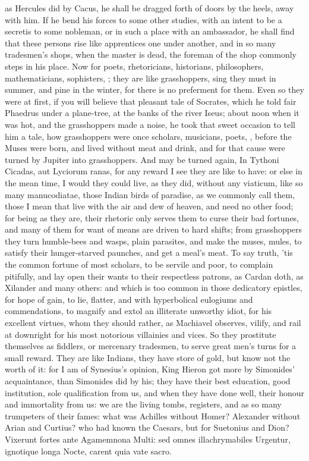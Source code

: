 {{as Hercules did by Cacus, he shall be dragged forth of doors by the
heels, away with him. If he bend his forces to some other studies, with
an intent to be a secretis to some nobleman, or in such a place with an
ambassador, he shall find that these persons rise like apprentices one
under another, and in so many tradesmen's shops, when the master is
dead, the foreman of the shop commonly steps in his place. Now for
poets, rhetoricians, historians, philosophers, mathematicians,
sophisters, \etc{}; they are like grasshoppers, sing they must in summer,
and pine in the winter, for there is no preferment for them. Even so
they were at first, if you will believe that pleasant tale of Socrates,
which he told fair Phaedrus under a plane-tree, at the banks of the
river Iseus; about noon when it was hot, and the grasshoppers made a
noise, he took that sweet occasion to tell him a tale, how grasshoppers
were once scholars, musicians, poets, \etc{}, before the Muses were born,
and lived without meat and drink, and for that cause were turned by
Jupiter into grasshoppers. And may be turned again, In Tythoni Cicadas,
aut Lyciorum ranas, for any reward I see they are like to have: or else
in the mean time, I would they could live, as they did, without any
viaticum, like so many manucodiatae, those Indian birds of
paradise, as we commonly call them, those I mean that live with the air
and dew of heaven, and need no other food; for being as they are, their
rhetoric only serves them to curse their bad fortunes, and many
of them for want of means are driven to hard shifts; from grasshoppers
they turn humble-bees and wasps, plain parasites, and make the muses,
mules, to satisfy their hunger-starved paunches, and get a meal's meat.
To say truth, 'tis the common fortune of most scholars, to be servile
and poor, to complain pitifully, and lay open their wants to their
respectless patrons, as Cardan doth, as Xilander and many
others: and which is too common in those dedicatory epistles, for hope
of gain, to lie, flatter, and with hyperbolical eulogiums and
commendations, to magnify and extol an illiterate unworthy idiot, for
his excellent virtues, whom they should rather, as Machiavel
observes, vilify, and rail at downright for his most notorious
villainies and vices. So they prostitute themselves as fiddlers, or
mercenary tradesmen, to serve great men's turns for a small reward.
They are like Indians, they have store of gold, but know not the
worth of it: for I am of Synesius's opinion, King Hieron got more
by Simonides' acquaintance, than Simonides did by his; they have their
best education, good institution, sole qualification from us, and when
they have done well, their honour and immortality from us: we are the
living tombs, registers, and as so many trumpeters of their fames: what
was Achilles without Homer? Alexander without Arian and Curtius? who
had known the Caesars, but for Suetonius and Dion?
Vixerunt fortes ante Agamemnona
Multi: sed omnes illachrymabiles
Urgentur, ignotique longa
Nocte, carent quia vate sacro.

}}
